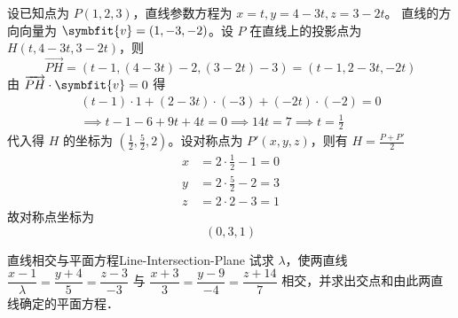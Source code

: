 \begin{solution}
    设已知点为 $P(1, 2, 3)$，直线参数方程为 $x = t, y = 4 - 3t, z = 3 - 2t$。
    直线的方向向量为 $\symbfit{v} = (1, -3, -2)$。设 $P$ 在直线上的投影点为 $H(t, 4 - 3t, 3 - 2t)$，则
    \begin{equation*}
        \overrightarrow{PH} = (t - 1, (4 - 3t) - 2, (3 - 2t) - 3) = (t - 1, 2 - 3t, -2t)
    \end{equation*}
    由 $\overrightarrow{PH} \cdot \symbfit{v} = 0$ 得
    \begin{equation*}
        \begin{aligned}
            (t - 1) \cdot 1 + (2 - 3t) \cdot (-3) + (-2t) \cdot (-2) = 0 \\
            \implies t - 1 - 6 + 9t + 4t = 0 \implies 14t = 7 \implies t = \frac{1}{2}
        \end{aligned}
    \end{equation*}
    代入得 $H$ 的坐标为 $\left( \frac{1}{2}, \frac{5}{2}, 2 \right)$。设对称点为 $P'(x, y, z)$，则有 $H = \frac{P + P'}{2}$
    \begin{equation*}
        \begin{aligned}
            x & = 2 \cdot \frac{1}{2} - 1 = 0 \\
            y & = 2 \cdot \frac{5}{2} - 2 = 3 \\
            z & = 2 \cdot 2 - 3 = 1
        \end{aligned}
    \end{equation*}
    故对称点坐标为
    \begin{equation*}
        \boxed{(0, 3, 1)}
    \end{equation*}
\end{solution}


\begin{problem}{直线相交与平面方程}{Line-Intersection-Plane}
    试求 $\lambda$，使两直线 $\dfrac{x - 1}{\lambda} = \dfrac{y + 4}{5} = \dfrac{z - 3}{-3}$ 与 $\dfrac{x + 3}{3} = \dfrac{y - 9}{-4} = \dfrac{z + 14}{7}$ 相交，并求出交点和由此两直线确定的平面方程．
\end{problem}

